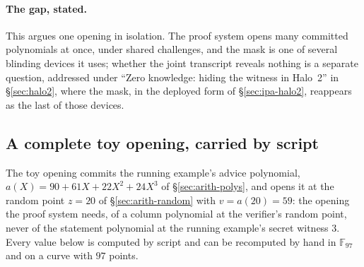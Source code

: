 \documentclass[11pt,a4paper]{article}
\theoremstyle{definition}
\newcommand{\F}{\mathbb{F}}
\begin{document}
\paragraph{The gap, stated.}
This argues one opening in isolation. The proof system opens many
committed polynomials at once, under shared challenges, and the mask is
one of several blinding devices it uses; whether the joint transcript
reveals nothing is a separate question, addressed under ``Zero knowledge:
hiding the witness in Halo~2'' in \S\ref{sec:halo2}, where the mask, in
the deployed form of \S\ref{sec:ipa-halo2}, reappears as the last of
those devices.

\subsection{A complete toy opening, carried by script}
\label{sec:ipa-toy}

The toy opening commits the running example's advice polynomial,
$a(X) = 90 + 61X + 22X^2 + 24X^3$ of \S\ref{sec:arith-polys}, and opens
it at the random point $z = 20$ of \S\ref{sec:arith-random} with
$v = a(20) = 59$: the opening the proof system needs, of a column
polynomial at the verifier's random point, never of the statement
polynomial at the running example's secret witness $3$. Every value
below is computed by script and can be recomputed by hand in $\F_{97}$
and on a curve with $97$ points.
\end{document}
